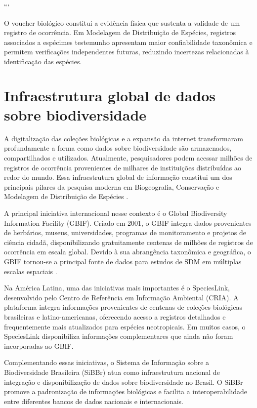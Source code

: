 ```

\begin{conceito}[title={\faBook\quad O papel do voucher em estudos de SDM}]
	O voucher biológico constitui a evidência física que sustenta a validade de um registro de ocorrência. Em Modelagem de Distribuição de Espécies, registros associados a espécimes testemunho apresentam maior confiabilidade taxonômica e permitem verificações independentes futuras, reduzindo incertezas relacionadas à identificação das espécies.
\end{conceito}

\section{Infraestrutura global de dados sobre biodiversidade}

A digitalização das coleções biológicas e a expansão da internet transformaram profundamente a forma como dados sobre biodiversidade são armazenados, compartilhados e utilizados. Atualmente, pesquisadores podem acessar milhões de registros de ocorrência provenientes de milhares de instituições distribuídas ao redor do mundo. Essa infraestrutura global de informação constitui um dos principais pilares da pesquisa moderna em Biogeografia, Conservação e Modelagem de Distribuição de Espécies \parencite{edwards2000gbif}.

A principal iniciativa internacional nesse contexto é o Global Biodiversity Information Facility (GBIF). Criado em 2001, o GBIF integra dados provenientes de herbários, museus, universidades, programas de monitoramento e projetos de ciência cidadã, disponibilizando gratuitamente centenas de milhões de registros de ocorrência em escala global. Devido à sua abrangência taxonômica e geográfica, o GBIF tornou-se a principal fonte de dados para estudos de SDM em múltiplas escalas espaciais \parencite{gbif2024}.

Na América Latina, uma das iniciativas mais importantes é o SpeciesLink, desenvolvido pelo Centro de Referência em Informação Ambiental (CRIA). A plataforma integra informações provenientes de centenas de coleções biológicas brasileiras e latino-americanas, oferecendo acesso a registros detalhados e frequentemente mais atualizados para espécies neotropicais. Em muitos casos, o SpeciesLink disponibiliza informações complementares que ainda não foram incorporadas ao GBIF.

Complementando essas iniciativas, o Sistema de Informação sobre a Biodiversidade Brasileira (SiBBr) atua como infraestrutura nacional de integração e disponibilização de dados sobre biodiversidade no Brasil. O SiBBr promove a padronização de informações biológicas e facilita a interoperabilidade entre diferentes bancos de dados nacionais e internacionais.

